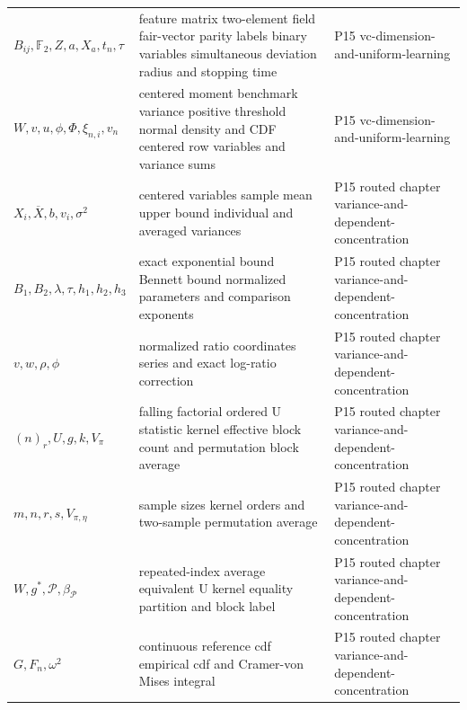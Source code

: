 \begin{longtable}{@{}p{}p{}p{}@{}}
\(B_{ij},\allowbreak \mathbb F_2,\allowbreak Z,\allowbreak a,\allowbreak X_a,\allowbreak t_n,\allowbreak \tau\) & feature matrix two-element field fair-vector parity labels binary variables simultaneous deviation radius and stopping time & P15 vc-\allowbreak{}dimension-\allowbreak{}and-\allowbreak{}uniform-\allowbreak{}learning \\
\(W,\allowbreak v,\allowbreak u,\allowbreak \phi,\allowbreak \Phi,\allowbreak \xi_{n,i},\allowbreak v_n\) & centered moment benchmark variance positive threshold normal density and CDF centered row variables and variance sums & P15 vc-\allowbreak{}dimension-\allowbreak{}and-\allowbreak{}uniform-\allowbreak{}learning \\
\(X_i,\allowbreak \overline X,\allowbreak b,\allowbreak v_i,\allowbreak \sigma^2\) & centered variables sample mean upper bound individual and averaged variances & P15 routed chapter variance-\allowbreak{}and-\allowbreak{}dependent-\allowbreak{}concentration \\
\(B_1,\allowbreak B_2,\allowbreak \lambda,\allowbreak \tau,\allowbreak h_1,\allowbreak h_2,\allowbreak h_3\) & exact exponential bound Bennett bound normalized parameters and comparison exponents & P15 routed chapter variance-\allowbreak{}and-\allowbreak{}dependent-\allowbreak{}concentration \\
\(v,\allowbreak w,\allowbreak \rho,\allowbreak \phi\) & normalized ratio coordinates series and exact log-ratio correction & P15 routed chapter variance-\allowbreak{}and-\allowbreak{}dependent-\allowbreak{}concentration \\
\((n)_r,\allowbreak U,\allowbreak g,\allowbreak k,\allowbreak V_\pi\) & falling factorial ordered U statistic kernel effective block count and permutation block average & P15 routed chapter variance-\allowbreak{}and-\allowbreak{}dependent-\allowbreak{}concentration \\
\(m,\allowbreak n,\allowbreak r,\allowbreak s,\allowbreak V_{\pi,\eta}\) & sample sizes kernel orders and two-sample permutation average & P15 routed chapter variance-\allowbreak{}and-\allowbreak{}dependent-\allowbreak{}concentration \\
\(W,\allowbreak g^*,\allowbreak \mathcal P,\allowbreak \beta_{\mathcal P}\) & repeated-index average equivalent U kernel equality partition and block label & P15 routed chapter variance-\allowbreak{}and-\allowbreak{}dependent-\allowbreak{}concentration \\
\(G,\allowbreak F_n,\allowbreak \omega^2\) & continuous reference cdf empirical cdf and Cramer-von Mises integral & P15 routed chapter variance-\allowbreak{}and-\allowbreak{}dependent-\allowbreak{}concentration \\

\end{longtable}
